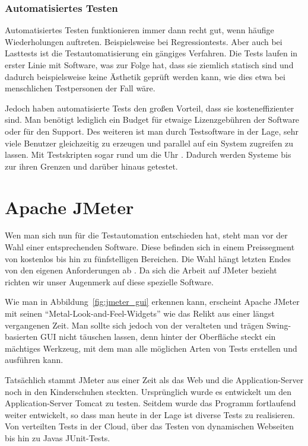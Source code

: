 \documentclass[a4paper,12pt]{article}
\begin{document}
\subsubsection{Automatisiertes Testen}
Automatisiertes Testen funktionieren immer dann recht gut, wenn häufige Wiederholungen auftreten. Beispielsweise bei Regressiontests. Aber auch bei Lasttests ist die Testautomatisierung ein gängiges Verfahren. Die Tests laufen in erster Linie mit Software, was zur Folge hat, dass sie ziemlich statisch sind und dadurch beispielsweise keine Ästhetik geprüft werden kann, wie dies etwa bei menschlichen Testpersonen der Fall wäre.

Jedoch haben automatisierte Tests den großen Vorteil, dass sie kosteneffizienter sind. Man benötigt lediglich ein Budget für etwaige Lizenzgebühren der Software oder für den Support. Des weiteren ist man durch Testsoftware in der Lage, sehr viele Benutzer gleichzeitig zu erzeugen und parallel auf ein System zugreifen zu lassen. Mit Testskripten sogar rund um die Uhr \cite{online:Testautomatisierung}. Dadurch werden Systeme bis zur ihren Grenzen und darüber hinaus getestet.

\section{Apache JMeter}
Wen man sich nun für die Testautomation entschieden hat, steht man vor der Wahl einer entsprechenden Software. Diese befinden sich in einem Preissegment von kostenlos bis hin zu fünfstelligen Bereichen. Die Wahl hängt letzten Endes von den eigenen Anforderungen ab \cite[S. 15]{book:ApacheJMeter}. Da sich die Arbeit auf JMeter bezieht richten wir unser Augenmerk auf diese spezielle Software.

Wie man in Abbildung~\ref{fig:jmeter_gui} erkennen kann, erscheint Apache JMeter mit seinen "`Metal-Look-and-Feel-Widgets"' \cite{online:wikiSwing} wie das Relikt aus einer längst vergangenen Zeit. Man sollte sich jedoch von der veralteten und trägen Swing-basierten GUI nicht täuschen lassen, denn hinter der Oberfläche steckt ein mächtiges Werkzeug, mit dem man alle möglichen Arten von Tests erstellen und ausführen kann. \cite{online:heiseJMeterOderGatling}

Tatsächlich stammt JMeter aus einer Zeit als das Web und die Application-Server noch in den Kinderschuhen steckten. Ursprünglich wurde es entwickelt um den Application-Server Tomcat zu testen. Seitdem wurde das Programm fortlaufend weiter entwickelt, so dass man heute in der Lage ist diverse Tests zu realisieren. Von verteilten Tests in der Cloud, über das Testen von dynamischen Webseiten bis hin zu Javas JUnit-Tests. \cite{online:ApacheJMeter}
\end{document}
